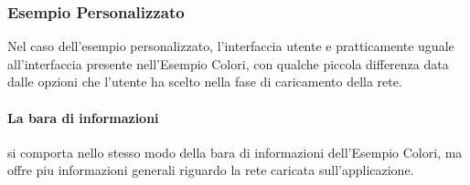 \documentclass[a4paper,12pt]{report}
\begin{document}
			
			\subsubsection{Esempio Personalizzato}

			Nel caso dell'esempio personalizzato, l'interfaccia utente e pratticamente uguale all'interfaccia presente nell'Esempio Colori, con qualche piccola differenza data dalle opzioni che l'utente ha scelto nella fase di caricamento della rete.

			\paragraph*{La bara di informazioni} si comporta nello stesso modo della bara di informazioni dell'Esempio Colori, ma offre piu informazioni generali riguardo la rete caricata sull'applicazione.
			
\end{document}
